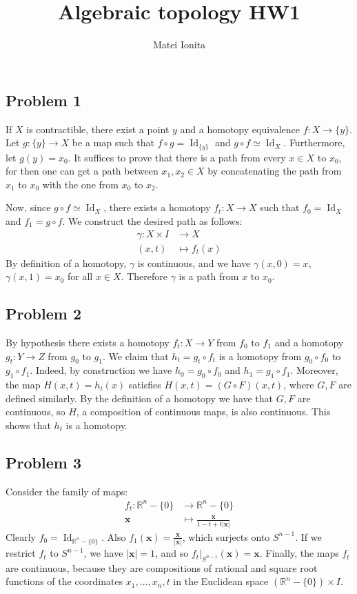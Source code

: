 \documentclass[12 pt]{article}
\title{Algebraic topology HW1}
\author{Matei Ionita}
\newcommand{\R}{\mathbb{R}}
\DeclareMathOperator{\id}{Id}
\begin{document}
  \maketitle

\subsection*{Problem 1}
If $X$ is contractible, there exist a point $y$ and a homotopy equivalence $f : X \to \{y\}$. Let $g : \{y\} \to X$ be a map such that $f \circ g = \id_{\{y\}}$ and $g \circ f \simeq \id_X$. Furthermore, let $g(y) = x_0$. It suffices to prove that there is a path from every $x \in X$ to $x_0$, for then one can get a path between $x_1, x_2 \in X$ by concatenating the path from $x_1$ to $x_0$ with the one from $x_0$ to $x_2$.

Now, since $g \circ f \simeq \id_X$, there exists a homotopy $f_t : X \to X$ such that $f_0 = \id_X$ and $f_1 = g\circ f$. We construct the desired path as follows:
\begin{align*}     
\gamma : X \times I &\to X    \\
(x,t) &\mapsto f_t(x)
\end{align*}
By definition of a homotopy, $\gamma$ is continuous, and we have $\gamma(x,0) = x$, $\gamma(x,1) = x_0$ for all $x\in X$. Therefore $\gamma$ is a path from $x$ to $x_0$.

\subsection*{Problem 2}
By hypothesis there exists a homotopy $f_t : X \to Y$ from $f_0$ to $f_1$ and a homotopy $g_t : Y \to Z$ from $g_0$ to $g_1$. We claim that $h_t = g_t \circ f_t$ is a homotopy from $g_0 \circ f_0$ to $g_1 \circ f_1$. Indeed, by construction we have $h_0 = g_0 \circ f_0$ and $h_1 = g_1 \circ f_1$. Moreover, the map $    H(x,t) = h_t(x)   $ satisfies $H(x,t) = (G \circ F)(x,t)$, where $G,F$ are defined similarly. By the definition of a homotopy we have that $G, F$ are continuous, so $H$, a composition of continuous maps, is also continuous. This shows that $h_t$ is a homotopy.

\subsection*{Problem 3}
Consider the family of maps:
\begin{align*}
      f_t : \R^{n} - \{0\} &\to \R^{n} - \{0 \}     \\
\mathbf{x} &\mapsto \frac{\mathbf{x}}{1 - t + t|\mathbf{x}|}
\end{align*}
Clearly $f_0 = \id_{\R^{n} - \{0\}}$. Also $f_1 (\mathbf{x}) = \frac{\mathbf{x}}{|\mathbf{x}|}$, which surjects onto $S^{n-1}$. If we restrict $f_t$ to $S^{n-1}$, we have $|\mathbf{x}| = 1$, and so $f_t|_{S^{n-1}} (\mathbf{x}) = \mathbf{x}$. Finally, the maps $f_t$ are continuous, because they are compositions of rational and square root functions of the coordinates $x_1, \dots, x_n,t$ in the Euclidean space $(\R^n - \{0\}) \times I$.
\end{document}
